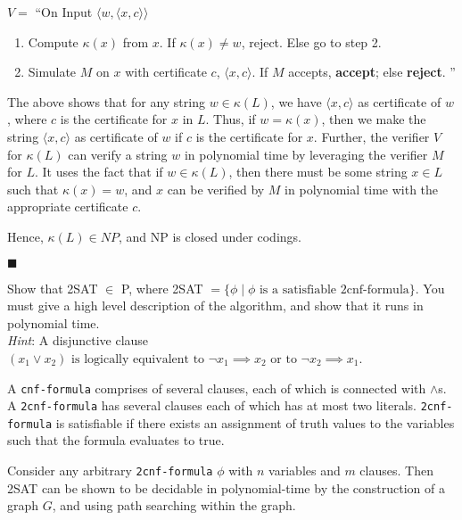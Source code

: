 \documentclass[addpoints,a4paper]{exam}
\begin{document}
\begin{questions}
\begin{solution}
    $ V = $ ``On Input $ \langle w, \langle x, c \rangle \rangle $ \vspace*{-2mm}
    \begin{enumerate}
      \item Compute $ \kappa(x) $ from $x$. If $ \kappa(x) \neq w $, reject. Else go to step 2. \vspace*{-1mm}
      \item Simulate $M$ on $x$ with certificate $c$, $ \langle x, c \rangle $. If $M$ accepts, \textbf{accept}; else \textbf{reject}. ''
    \end{enumerate}

    The above shows that for any string $ w \in \kappa(L) $, we have $ \langle x, c \rangle $ as certificate of $w$, where $c$ is the certificate for $x$ in $L$. Thus, if $ w = \kappa(x) $, then we make the string $ \langle x, c \rangle $ as certificate of $w$ if $c$ is the certificate for $x$. Further, the verifier $V$ for $ \kappa(L) $ can verify a string $w$ in polynomial time by leveraging the verifier $M$ for $L$. It uses the fact that if $ w \in \kappa(L) $, then there must be some string $ x \in L $ such that $ \kappa(x) = w $, and $x$ can be verified by $M$ in polynomial time with the appropriate certificate $c$.

    Hence, $ \kappa(L) \in NP $, and NP is closed under codings. \vspace*{-4mm}
    \begin{flushright}
      $ \blacksquare $
    \end{flushright}
  \end{solution}


  \question[25] Show that 2SAT $\in$  P, where 2SAT $ = \{ \phi \mid \phi \text{ is a satisfiable 2cnf-formula}\}$. You must give a high level description of the algorithm, and show that it runs in polynomial time. \\ \textit{Hint}: A disjunctive clause $(x_1 \vee x_2) \text{ is logically equivalent to } \neg x_1 \implies x_2 \text{ or to } \neg x_2 \implies x_1$.
  \begin{solution}
    A \texttt{cnf-formula} comprises of several clauses, each of which is connected with $ \land $s. A \texttt{2cnf-formula} has several clauses each of which has at most two literals. \texttt{2cnf-formula} is satisfiable if there exists an assignment of truth values to the variables such that the formula evaluates to true.

    Consider any arbitrary \texttt{2cnf-formula} $ \phi $ with $n$ variables and $m$ clauses. Then 2SAT can be shown to be decidable in polynomial-time by the construction of a graph $ G $, and using path searching within the graph.


\end{solution}
\end{questions}
\end{document}

